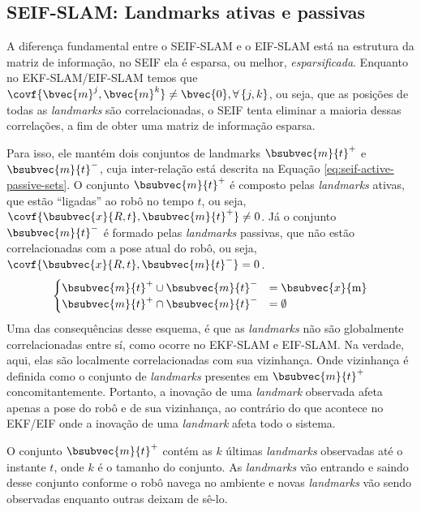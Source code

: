 \subsection{SEIF-SLAM: Landmarks ativas e passivas}
\label{sec:seif-active-passive-landmarks}
A diferença fundamental entre o SEIF-SLAM e o EIF-SLAM está na estrutura da matriz de informação, no SEIF ela é esparsa, ou melhor, 
\emph{esparsificada}. Enquanto no EKF-SLAM/EIF-SLAM temos 
que $\covf{\bvec{m}^j, \bvec{m}^k} \neq \bvec{0}, 
\forall\, \{j,k\}$, ou seja, que as posições de todas as 
\textit{landmarks} são correlacionadas, o SEIF tenta eliminar a maioria 
dessas correlações, a fim de obter uma matriz de informação esparsa.

Para isso, ele mantém dois conjuntos de landmarks $\bsubvec{m}{t}^+$ e $\bsubvec{m}{t}^-$, cuja inter-relação está descrita na Equação \ref{eq:seif-active-passive-sets}. O conjunto $\bsubvec{m}{t}^+$ é composto pelas \textit{landmarks} ativas, que estão
``ligadas'' ao robô no tempo $t$, ou seja, 
$\covf{\bsubvec{x}{R, t}, \bsubvec{m}{t}^+} \neq 0$. Já o conjunto 
$\bsubvec{m}{t}^-$ é 
formado pelas \textit{landmarks} passivas, que não estão correlacionadas com 
a pose atual do robô, ou seja, 
$\covf{\bsubvec{x}{R, t}, \bsubvec{m}{t}^-} = 0$.
\begin{equation}
\begin{cases}
  \bsubvec{m}{t}^+ \cup \bsubvec{m}{t}^- &= \bsubvec{x}{\mathrm{m}} \\
  \bsubvec{m}{t}^+ \cap \bsubvec{m}{t}^- &= \emptyset
\end{cases}
\label{eq:seif-active-passive-sets}
\end{equation}
Uma das consequências desse esquema, é que as \textit{landmarks} não são 
globalmente correlacionadas entre sí, como ocorre no EKF-SLAM e EIF-SLAM. Na 
verdade, aqui, elas são localmente correlacionadas com sua vizinhança. Onde 
vizinhança é definida como o conjunto de \textit{landmarks} presentes em 
$\bsubvec{m}{t}^+$ concomitantemente. Portanto, a inovação de uma 
\textit{landmark} observada afeta apenas a pose do robô e de sua vizinhança, 
ao contrário do que acontece no EKF/EIF onde a inovação de uma 
\textit{landmark} afeta todo o sistema.

O conjunto $\bsubvec{m}{t}^+$ contém as $k$ últimas \textit{landmarks} 
observadas até o instante $t$, onde $k$ é o tamanho do conjunto. As 
\textit{landmarks} vão entrando e saindo desse conjunto conforme o robô 
navega no ambiente e novas \textit{landmarks} vão sendo observadas enquanto 
outras deixam de sê-lo.

